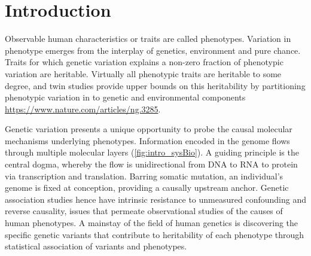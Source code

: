 %
%


\chapter{Introduction}
\label{ch:discussion}

\begin{outline}


\1 Observable human characteristics or traits are called phenotypes.
    \2 Variation in phenotype emerges from the interplay of genetics, environment and pure chance.
    \2 Traits for which genetic variation explains a non-zero fraction of phenotypic variation are heritable.
    \2 Virtually all phenotypic traits are heritable to some degree, and twin studies provide upper bounds on this heritability by partitioning phenotypic variation in to genetic and environmental components \url{https://www.nature.com/articles/ng.3285}.

\1 Genetic variation presents a unique opportunity to probe the causal molecular mechanisms underlying phenotypes.
    \2 Information encoded in the genome flows through multiple molecular layers (\autoref{fig:intro_sysBio}).
    \2 A guiding principle is the central dogma, whereby the flow is unidirectional from DNA to RNA to protein via transcription and translation.
    \2 Barring somatic mutation, an individual's genome is fixed at conception, providing a causally upstream anchor.
    \2 Genetic association studies hence have intrinsic resistance to unmeasured confounding and reverse causality, issues that permeate observational studies of the causes of human phenotypes.
\1 A mainstay of the field of human genetics is discovering the specific genetic variants that contribute to heritability of each phenotype through statistical association of variants and phenotypes.


\end{outline}

